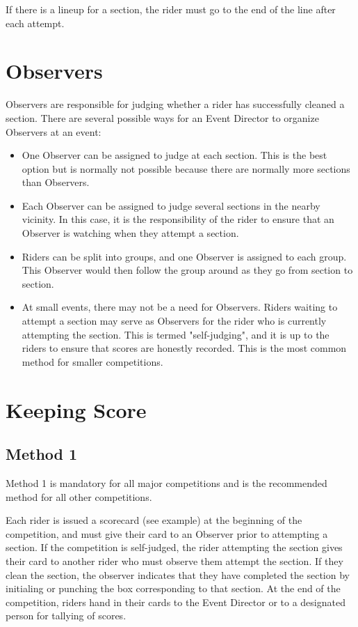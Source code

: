 If there is a lineup for a section, the rider must go to the end of the line after each attempt.

\section{Observers}
Observers are responsible for judging whether a rider has successfully cleaned a section. 
There are several possible ways for an Event Director to organize Observers at an event:
\begin{itemize}
\item One Observer can be assigned to judge at each section. 
This is the best option but is normally not possible because there are normally more sections than Observers.
\item Each Observer can be assigned to judge several sections in the nearby vicinity. 
In this case, it is the responsibility of the rider to ensure that an Observer is watching when they attempt a section.
\item Riders can be split into groups, and one Observer is assigned to each group. 
This Observer would then follow the group around as they go from section to section.
\item At small events, there may not be a need for Observers. 
Riders waiting to attempt a section may serve as Observers
for the rider who is currently attempting the section. 
This is termed "self-judging", and it is up to the riders to ensure that scores are honestly recorded. 
This is the most common method for smaller competitions.
\end{itemize}

\section{Keeping Score}

\subsection{Method 1}
Method 1 is mandatory for all major competitions and is the recommended method for all other competitions.

Each rider is issued a scorecard (see example) at the beginning of the competition, and must give their card to an Observer prior to attempting a section.
If the competition is self-judged, the rider attempting the section gives their card to another rider who must observe them attempt the section.
If they clean the section, the observer indicates that they have completed the section by initialing or punching the box corresponding to that section. 
At the end of the competition, riders hand in their cards to the Event Director or to a designated person for tallying of scores.

